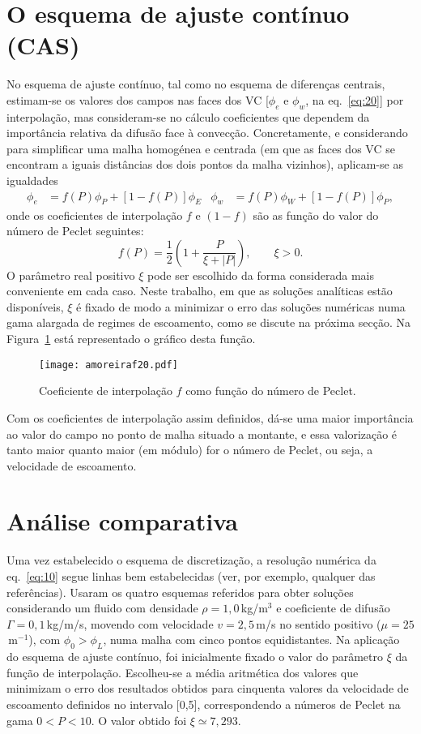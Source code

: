 \documentclass[11pt,twoside]{article}
\begin{document}
{\section{O esquema de ajuste contínuo (CAS)}
No esquema de ajuste contínuo, tal como no esquema de diferenças centrais, estimam-se os valores dos campos nas
faces dos VC [$\phi_e$ e $\phi_w$, na eq.~\eqref{eq:20}] por interpolação, mas consideram-se no cálculo coeficientes
que dependem da importância relativa da difusão face à convecção. Concretamente, e considerando para simplificar
uma malha homogénea e centrada (em que as faces dos VC se encontram a iguais distâncias dos dois pontos da
malha vizinhos), aplicam-se as igualdades
\begin{align}
    \phi_e &= f(P)\phi_P + [1-f(P)]\phi_E&
    \phi_w &= f(P)\phi_W + [1-f(P)]\phi_P,
\end{align}
onde os coeficientes de interpolação $f$ e $(1-f)$ são as função do valor do número
de Peclet seguintes:
\begin{equation}
    f(P)=\frac12\left(1+\frac{P}{\xi+|P|}\right),\qquad\xi>0.
\end{equation}
O parâmetro real positivo $\xi$ pode ser escolhido da forma considerada mais
conveniente em cada caso. Neste trabalho, em que as soluções analíticas estão
disponíveis, $\xi$ é fixado de modo a minimizar o erro das soluções numéricas
numa gama alargada de regimes de escoamento, como se discute na próxima secção.
Na Figura~\ref{fig:20} está representado o gráfico desta função.
\begin{figure}[!h]
\centering
\texttt{[image: amoreiraf20.pdf]}
\caption{Coeficiente de interpolação $f$ como função do número de Peclet.
\label{fig:20}}
\end{figure}
Com os coeficientes de interpolação assim definidos, dá-se uma maior importância ao valor do campo no ponto de
malha situado a montante, e essa valorização é tanto maior quanto maior (em módulo) for o número de Peclet, ou seja, a velocidade de escoamento.


\section{Análise comparativa}
Uma vez estabelecido o esquema de discretização, a resolução numérica da
eq.~\eqref{eq:10} segue linhas bem estabelecidas (ver, por exemplo, qualquer das referências). Usaram os 
quatro esquemas referidos para obter soluções considerando um fluido com densidade $\rho=1,\!0$\,kg/m$^3$ e
coeficiente de difusão $\Gamma=0,\!1$\,kg/m/s, movendo com velocidade $v=2,\!5$\,m/s no sentido positivo
($\mu=25$\,m$^{-1}$), com $\phi_0>\phi_L$,  numa malha com cinco pontos equidistantes. Na aplicação do esquema
de ajuste contínuo, foi inicialmente fixado o valor do parâmetro $\xi$ da função de interpolação. Escolheu-se a média
aritmética dos valores que minimizam o erro dos resultados obtidos para cinquenta valores da velocidade de
escoamento definidos no intervalo [0,5], correspondendo a números de Peclet na gama $0<P<10$. O valor obtido foi
$\xi\simeq7,\!293$.

}
\end{document}
